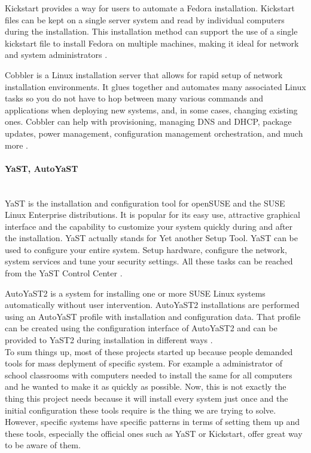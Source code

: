 \documentclass[thesis=B,english]{FITthesis}[2013/04/26]
\newcommand{\myparagraph}[1]{\paragraph{#1}\mbox{}\\}
\begin{document}
Kickstart provides a way for users to automate a Fedora installation. Kickstart files can be kept on a single server system and read by individual computers during the installation. This installation method can support the use of a single kickstart file to install Fedora on multiple machines, making it ideal for network and system administrators \cite{kickstart}.

Cobbler is a Linux installation server that allows for rapid setup of network installation environments. It glues together and automates many associated Linux tasks so you do not have to hop between many various commands and applications when deploying new systems, and, in some cases, changing existing ones. Cobbler can help with provisioning, managing DNS and DHCP, package updates, power management, configuration management orchestration, and much more \cite{cobbler}.

\myparagraph{YaST, AutoYaST}

YaST is the installation and configuration tool for openSUSE and the SUSE Linux Enterprise distributions. It is popular for its easy use, attractive graphical interface and the capability to customize your system quickly during and after the installation. YaST actually stands for Yet another Setup Tool. YaST can be used to configure your entire system. Setup hardware, configure the network, system services and tune your security settings. All these tasks can be reached from the YaST Control Center \cite{yast}.

AutoYaST2 is a system for installing one or more SUSE Linux systems automatically without user intervention. AutoYaST2 installations are performed using an AutoYaST profile with installation and configuration data. That profile can be created using the configuration interface of AutoYaST2 and can be provided to YaST2 during installation in different ways \cite{autoyast}. \\

To sum things up, most of these projects started up because people demanded tools for mass deplyment of specific system. For example a administrator of school classrooms with computers needed to install the same for all computers and he wanted to make it as quickly as possible. Now, this is not exactly the thing this project needs because it will install every system just once and the initial configuration these tools require is the thing we are trying to solve. However, specific systems have specific patterns in terms of setting them up and these tools, especially the official ones such as YaST or Kickstart, offer great way to be aware of them.
\end{document}
